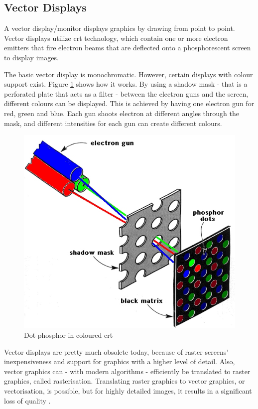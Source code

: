 \subsection{Vector Displays}
A vector display/monitor displays graphics by drawing from point to point.
Vector displays utilize \gls{crt} technology, which contain one or more electron emitters that fire electron beams that are deflected onto a phosphorescent screen to display images.

The basic vector display is monochromatic.
However, certain displays with colour support exist.
Figure \ref{fig:color_crt} shows how it works.
By using a shadow mask - that is a perforated plate that acts as a filter - between the electron guns and the screen, different colours can be displayed.
This is achieved by having one electron gun for red, green and blue.
Each gun shoots electron at different angles through the mask, and different intensities for each gun can create different colours. \cite{monitors}

\begin{figure}
	\centering
	\includegraphics[width=0.5 \textwidth]{images/color_crt.jpg}
	\caption{Dot phosphor in coloured \gls{crt} \cite{monitors}}
	\label{fig:color_crt}
\end{figure}

Vector displays are pretty much obsolete today, because of raster screens' inexpensiveness and support for graphics with a higher level of detail.\cite{lcd-vs-crt}
Also, vector graphics can - with modern algorithms - efficiently be translated to raster graphics, called rasterisation.
Translating raster graphics to vector graphics, or vectorisation, is possible, but for highly detailed images, it results in a significant loss of quality \cite{vectorisation}.
